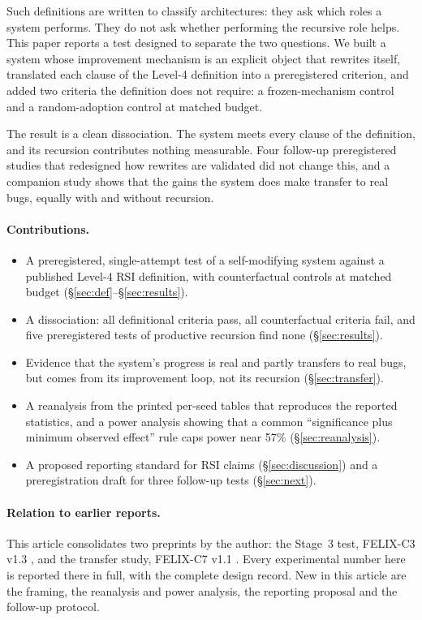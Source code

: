 \documentclass[11pt]{article}
\begin{document}
Such definitions are written to classify architectures: they ask which roles a system performs. They do not ask whether performing the recursive role helps. This paper reports a test designed to separate the two questions. We built a system whose improvement mechanism is an explicit object that rewrites itself, translated each clause of the Level-4 definition into a preregistered criterion, and added two criteria the definition does not require: a frozen-mechanism control and a random-adoption control at matched budget.

The result is a clean dissociation. The system meets every clause of the definition, and its recursion contributes nothing measurable. Four follow-up preregistered studies that redesigned how rewrites are validated did not change this, and a companion study shows that the gains the system does make transfer to real bugs, equally with and without recursion.

\paragraph{Contributions.}
\begin{itemize}
\item A preregistered, single-attempt test of a self-modifying system against a published Level-4 RSI definition, with counterfactual controls at matched budget (\S\ref{sec:def}--\S\ref{sec:results}).
\item A dissociation: all definitional criteria pass, all counterfactual criteria fail, and five preregistered tests of productive recursion find none (\S\ref{sec:results}).
\item Evidence that the system's progress is real and partly transfers to real bugs, but comes from its improvement loop, not its recursion (\S\ref{sec:transfer}).
\item A reanalysis from the printed per-seed tables that reproduces the reported statistics, and a power analysis showing that a common ``significance plus minimum observed effect'' rule caps power near 57\% (\S\ref{sec:reanalysis}).
\item A proposed reporting standard for RSI claims (\S\ref{sec:discussion}) and a preregistration draft for three follow-up tests (\S\ref{sec:next}).
\end{itemize}

\paragraph{Relation to earlier reports.} This article consolidates two preprints by the author: the Stage~3 test, FELIX-C3 v1.3 \cite{felix2026c3}, and the transfer study, FELIX-C7 v1.1 \cite{felix2026c7}. Every experimental number here is reported there in full, with the complete design record. New in this article are the framing, the reanalysis and power analysis, the reporting proposal and the follow-up protocol.
\end{document}
